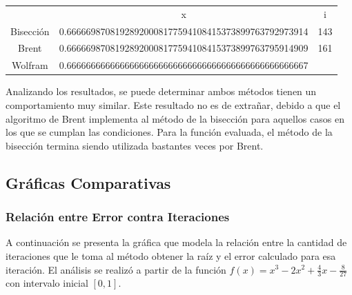 \documentclass[a4paper,12pt]{article}
\begin{document}
\begin{table}[ht!]
\begin{tabular}{crr}
          & \multicolumn{1}{c}{x}                                & \multicolumn{1}{c}{i} \\
Bisección & 0.66666987081928920008177594108415373899763792973914 & 143                   \\
Brent     & 0.66666987081928920008177594108415373899763795914909 & 161                   \\
Wolfram   & 0.66666666666666666666666666666666666666666666666667 & \multicolumn{1}{l}{} 
\end{tabular}
\end{table}

Analizando los resultados, se puede determinar ambos métodos tienen un comportamiento muy similar. Este resultado no es de extrañar, debido a que el algoritmo de Brent implementa al método de la bisección para aquellos casos en los que se cumplan las condiciones. Para la función evaluada, el método de la bisección termina siendo utilizada bastantes veces por Brent. \par

\newpage

\subsection{Gráficas Comparativas}

\subsubsection{Relación entre Error contra Iteraciones}

A continuación se presenta la gráfica que modela la relación entre la cantidad de iteraciones que le toma al método obtener la raíz y el error calculado para esa iteración. El análisis se realizó a partir de la función $f(x)=x^3-2x^2+\frac{4}{3}x-\frac{8}{27}$ con intervalo inicial $[0,1]$. \par
\end{document}
